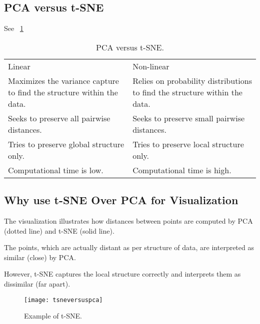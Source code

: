	\subsection{PCA versus t-SNE}
See \tablename~\ref{tab:pcaversustsne}
	\begin{table}
        \centering
        \caption[PCA versus t-SNE]{PCA versus t-SNE.}
        \label{tab:pcaversustsne}
		\begin{tabular}{|p{}|p{}|} \hline
				\tablecolumnheadervlinesone{PCA} & \tablecolumnheadervlinestwo{t-SNE} \\ \hline
				Linear &
	            Non-linear \\ \hline
				Maximizes the variance capture to find the structure within the data. &
				Relies on probability distributions to find the structure within the data.  \\ \hline
				Seeks to preserve all pairwise distances. &
				Seeks to preserve small pairwise distances. \\ \hline
				Tries to preserve global structure only. &
				Tries to preserve local structure only. \\ \hline
				Computational time is low. &
				Computational time is high. \\ \hline
		\end{tabular}
	\end{table}


	\subsection{Why use t-SNE Over PCA for Visualization}
	\begin{bulletedlist}
		\item The visualization illustrates how distances between points are computed by PCA (dotted line) and t-SNE (solid line).
		\item The points, which are actually distant as per structure of data, are interpreted as similar (close) by PCA.
		\item However, t-SNE captures the local structure correctly and interprets them as dissimilar (far apart).
	\end{bulletedlist}

 	\begin{figure}[h]
		\centering
		\texttt{[image: tsneversuspca]}
		\caption[Example of t-SNE]{Example of t-SNE.}
		\label{fig:tsneversuspca}
	\end{figure}

